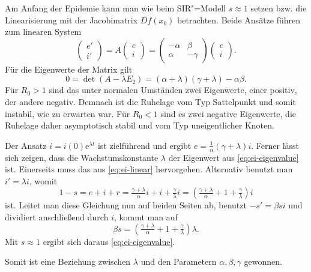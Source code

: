 \documentclass[a4paper,10pt,fleqn,twocolumn,twoside,dvipdfmx]{scrartcl}
\numberwithin{equation}{section}
\newcommand{\ee}{\mathrm e}
\begin{document}
Am Anfang der Epidemie kann man wie beim SIR"=Modell $s\approx 1$ setzen
bzw. die Linearisierung mit der Jacobimatrix $Df(x_0)$ betrachten.
Beide Ansätze führen zum linearen System
\begin{equation}\label{eq:ei-linear}
\begin{pmatrix}e'\\ i'
\end{pmatrix}
= A\begin{pmatrix}
e\\ i
\end{pmatrix}
= \begin{pmatrix}
-\alpha & \beta\\
\alpha & -\gamma
\end{pmatrix}
\begin{pmatrix}
e\\ i
\end{pmatrix}.
\end{equation}
Für die Eigenwerte der Matrix gilt
\begin{equation}\label{eq:ei-eigenvalue}
0 = \det(A-\lambda E_2) = (\alpha+\lambda)(\gamma+\lambda)-\alpha\beta.
\end{equation}
Für $R_0>1$ sind das unter normalen Umständen zwei Eigenwerte,
einer positiv, der andere negativ. Demnach ist die Ruhelage
vom Typ Sattelpunkt und somit instabil, wie zu erwarten war.
Für $R_0<1$ sind es zwei negative Eigenwerte, die Ruhelage daher
asymptotisch stabil und vom Typ uneigentlicher Knoten.

Der Ansatz $i=i(0)\ee^{\lambda t}$ ist zielführend und
ergibt $e=\tfrac{1}{\alpha}(\gamma+\lambda)i$. Ferner lässt sich
zeigen, dass die Wachstumskonstante $\lambda$ der Eigenwert
aus \eqref{eq:ei-eigenvalue} ist. Einerseits muss das aus
\eqref{eq:ei-linear} hervorgehen. Alternativ benutzt man $i'=\lambda i$,
womit %
\[1-s = e + i + r
= \tfrac{\gamma+\lambda}{\alpha}i + i + \tfrac{\gamma}{\lambda} i
= (\tfrac{\gamma+\lambda}{\alpha} + 1 + \tfrac{\gamma}{\lambda})i\]
ist. Leitet man diese Gleichung nun auf beiden Seiten ab,
benutzt $-s' = \beta si$ und dividiert anschließend durch $i$,
kommt man auf%
\begin{equation}
\beta s = (\tfrac{\gamma+\lambda}{\alpha} + 1 + \tfrac{\gamma}{\lambda})\lambda.
\end{equation}
Mit $s\approx 1$ ergibt sich daraus \eqref{eq:ei-eigenvalue}.

Somit ist eine Beziehung zwischen $\lambda$ und den Parametern
$\alpha,\beta,\gamma$ gewonnen.
\end{document}
